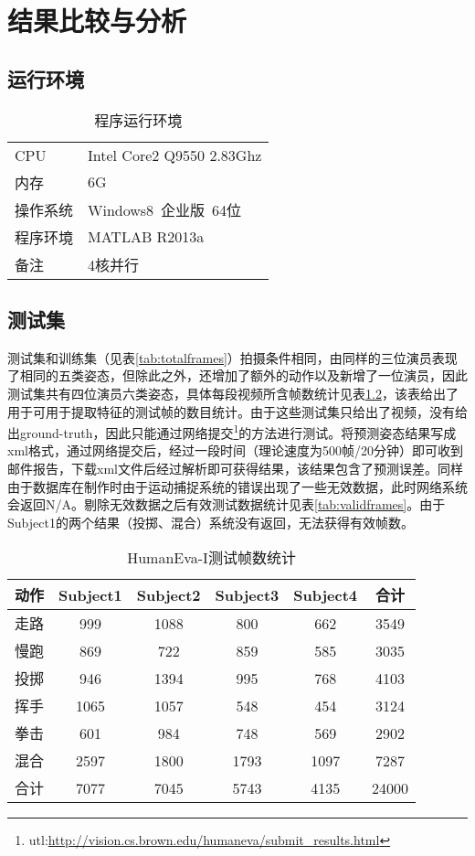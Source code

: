 

\chapter{结果比较与分析}

\section{运行环境}
\begin{table}[htbp]
  \centering
  \caption{程序运行环境}
  \label{tab:sysenr}
    \begin{tabular}{p{6em}|l}
      \toprule[1.5pt]
      CPU & Intel Core2 Q9550 2.83Ghz\\
      内存 & 6G\\
      操作系统 & Windows8\ 企业版\ 64位\\
      程序环境 & MATLAB R2013a\\
      备注 & 4核并行\\
      \bottomrule[1.5pt]
    \end{tabular}
\end{table}

\section{测试集}
测试集和训练集（见表\ref{tab:totalframes}）拍摄条件相同，由同样的三位演员表现了相同的五类姿态，但除此之外，还增加了额外的动作以及新增了一位演员，因此测试集共有四位演员六类姿态，具体每段视频所含帧数统计见表\ref{tab:testframes}，该表给出了用于可用于提取特征的测试帧的数目统计。由于这些测试集只给出了视频，没有给出ground-truth，因此只能通过网络提交\footnote{utl:\url{http://vision.cs.brown.edu/humaneva/submit_results.html}}的方法进行测试。将预测姿态结果写成xml格式，通过网络提交后，经过一段时间（理论速度为500帧/20分钟）即可收到邮件报告，下载xml文件后经过解析即可获得结果，该结果包含了预测误差。同样由于数据库在制作时由于运动捕捉系统的错误出现了一些无效数据，此时网络系统会返回N/A。剔除无效数据之后有效测试数据统计见表\ref{tab:validframes}。由于Subject1的两个结果（投掷、混合）系统没有返回，无法获得有效帧数。

\begin{table}[H]
  \centering
  \caption{HumanEva-I测试帧数统计}
  \label{tab:testframes}
    \begin{tabular}{lccccc}
      \toprule[1.5pt]
      动作 & Subject1 & Subject2 & Subject3 & Subject4 & 合计 \\\midrule[1pt]
      走路 & 999 & 1088 & 800 & 662 & 3549\\
      慢跑 & 869 & 722 & 859 & 585 & 3035\\
      投掷 & 946 & 1394 & 995 & 768 & 4103\\
      挥手 & 1065 & 1057 & 548 & 454 & 3124\\
      拳击 & 601 & 984 & 748 & 569 & 2902\\
      混合 & 2597 & 1800 & 1793 & 1097 & 7287\\
      合计 & 7077 & 7045 & 5743 & 4135 & 24000\\
      \bottomrule[1.5pt]
    \end{tabular}
\end{table}

